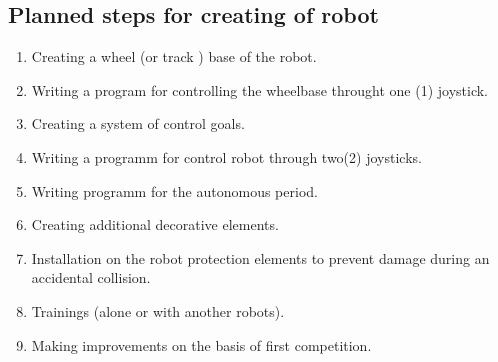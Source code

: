\subsection{Planned steps for creating of robot}
\begin{enumerate}
	\item Creating a wheel (or track ) base of the robot.
	\item Writing a program for controlling the wheelbase throught one (1) joystick.
	\item Creating a system of control goals.
	\item Writing a programm for control robot through two(2) joysticks.
	\item Writing programm for the autonomous period.
	\item Creating additional decorative elements.
	\item Installation on the robot protection elements to prevent damage during an accidental collision.
	\item Trainings (alone or with another robots).
	\item Making improvements on the basis of first competition.
\end{enumerate}
\fillpage

